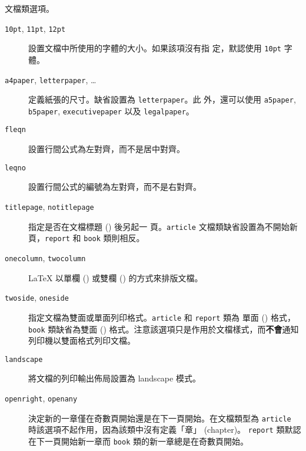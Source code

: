 \begin{table}[!bp]
\caption{文檔類選項。} \label{options}
\begin{lined}{\textwidth}
\begin{flushleft}
\begin{description}
\item[\normalfont\texttt{10pt}, \texttt{11pt}, \texttt{12pt}] \quad 設置文檔中所使用的字體的大小。如果該項沒有指
  定，默認使用 \texttt{10pt} 字體。
\item[\normalfont\texttt{a4paper}, \texttt{letterpaper}, \ldots] \quad 定義紙張的尺寸。缺省設置為 \texttt{letterpaper}。此
  外，還可以使用 \texttt{a5paper}, \texttt{b5paper}, \texttt{executivepaper} 以及 \texttt{legalpaper}。
   

\item[\normalfont\texttt{fleqn}] \quad 設置行間公式為左對齊，而不是居中對齊。

\item[\normalfont\texttt{leqno}] \quad
設置行間公式的編號為左對齊，而不是右對齊。

\item[\normalfont\texttt{titlepage}, \texttt{notitlepage}] \quad 指定是否在文檔標題 () 後另起一
  頁。\texttt{article} 文檔類缺省設置為不開始新頁，\texttt{report} 和 \texttt{book} 類則相反。

\item[\normalfont\texttt{onecolumn}, \texttt{twocolumn}] \quad
  \LaTeX{} 以單欄 () 或雙欄 () 的方式來排版文檔。

\item[\normalfont\texttt{twoside}, \texttt{oneside}] \quad 指定文檔為雙面或單面列印格式。\texttt{article} 和 \texttt{report} 類為
  單面 () 格式，\texttt{book} 類缺省為雙面 () 格式。注意該選項只是作用於文檔樣式，而\textbf{不會}通知列印機以雙面格式列印文檔。

\item[\normalfont\texttt{landscape}] \quad
將文檔的列印輸出佈局設置為 landscape 模式。

\item[\normalfont\texttt{openright}, \texttt{openany}] \quad 決定新的一章僅在奇數頁開始還是在下一頁開始。在文檔類型為 \texttt{article} 時該選項不起作用，因為該類中沒有定義「章」 (chapter)。 \texttt{report} 類默認在下一頁開始新一章而 \texttt{book} 類的新一章總是在奇數頁開始。

\end{description}
\end{flushleft}
\end{lined}
\end{table}

